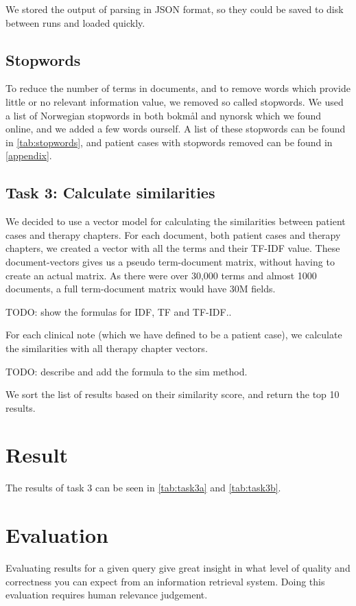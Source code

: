 \documentclass[a4paper, 12pt]{article}
\begin{document}
We stored the output of parsing in JSON format, so they could be saved to disk
between runs and loaded quickly.

\subsection{Stopwords}
To reduce the number of terms in documents, and to remove words which provide
little or no relevant information value, we removed so called stopwords.
We used a list of Norwegian stopwords in both bokmål and nynorsk which we
found online, and we added a few words ourself. A list of these stopwords can
be found in \autoref{tab:stopwords}, and patient cases with stopwords removed
can be found in \autoref{appendix}.

\subsection{Task 3: Calculate similarities}
We decided to use a vector model for calculating the similarities between
patient cases and therapy chapters. For each document, both patient cases
and therapy chapters, we created a vector with all the terms and their
TF-IDF value. These document-vectors gives us a pseudo term-document matrix,
without having to create an actual matrix. As there were over 30,000 terms
and almost 1000 documents, a full term-document matrix would have 30M fields.

TODO: show the formulas for IDF, TF and TF-IDF..

For each clinical note (which we have defined to be a patient case), we
calculate the similarities with all therapy chapter vectors.

TODO: describe and add the formula to the sim method.

We sort the list of results based on their similarity score, and return the
top 10 results.


\section{Result}
\label{sec:result}
The results of task 3 can be seen in \autoref{tab:task3a} and
\autoref{tab:task3b}.



\section{Evaluation}
\label{sec:evaluation}
Evaluating results for a given query give great insight in what level of quality and correctness you can expect from an information retrieval system. Doing this evaluation requires human relevance judgement.
\end{document}
